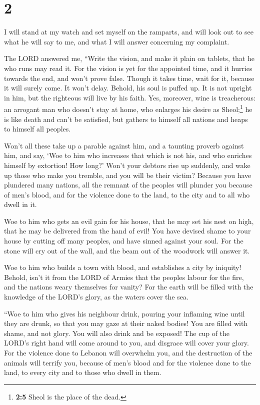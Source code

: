 \hypertarget{section-1}{%
\section{2}\label{section-1}}

 I will stand at my watch and set myself on the ramparts,
and will look out to see what he will say to me, and what I will answer
concerning my complaint.

 The LORD answered me, ``Write the vision, and make it
plain on tablets, that he who runs may read it.  For the
vision is yet for the appointed time, and it hurries towards the end,
and won't prove false. Though it takes time, wait for it, because it
will surely come. It won't delay.  Behold, his soul is
puffed up. It is not upright in him, but the righteous will live by his
faith.  Yes, moreover, wine is treacherous: an arrogant
man who doesn't stay at home, who enlarges his desire as
Sheol;\footnote{\textbf{2:5} Sheol is the place of the dead.} he is like
death and can't be satisfied, but gathers to himself all nations and
heaps to himself all peoples.

 Won't all these take up a parable against him, and a
taunting proverb against him, and say, `Woe to him who increases that
which is not his, and who enriches himself by extortion! How long?'
 Won't your debtors rise up suddenly, and wake up those
who make you tremble, and you will be their victim? 
Because you have plundered many nations, all the remnant of the peoples
will plunder you because of men's blood, and for the violence done to
the land, to the city and to all who dwell in it.

 Woe to him who gets an evil gain for his house, that he
may set his nest on high, that he may be delivered from the hand of
evil!  You have devised shame to your house by cutting
off many peoples, and have sinned against your soul.  For
the stone will cry out of the wall, and the beam out of the woodwork
will answer it.

 Woe to him who builds a town with blood, and establishes
a city by iniquity!  Behold, isn't it from the LORD of
Armies that the peoples labour for the fire, and the nations weary
themselves for vanity?  For the earth will be filled with
the knowledge of the LORD's glory, as the waters cover the sea.

 ``Woe to him who gives his neighbour drink, pouring your
inflaming wine until they are drunk, so that you may gaze at their naked
bodies!  You are filled with shame, and not glory. You
will also drink and be exposed! The cup of the LORD's right hand will
come around to you, and disgrace will cover your glory. 
For the violence done to Lebanon will overwhelm you, and the destruction
of the animals will terrify you, because of men's blood and for the
violence done to the land, to every city and to those who dwell in them.

